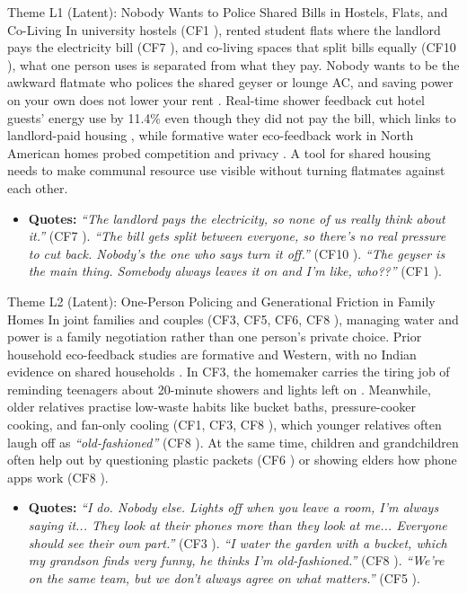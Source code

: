 \documentclass[12pt, a4paper]{article}
\begin{document}
\begin{latentcard}{Theme L1 (Latent): Nobody Wants to Police Shared Bills in Hostels, Flats, and Co-Living}
In university hostels (CF1 \cite{cf1}), rented student flats where the landlord pays the electricity bill (CF7 \cite{cf7}), and co-living spaces that split bills equally (CF10 \cite{cf10}), what one person uses is separated from what they pay. Nobody wants to be the awkward flatmate who polices the shared geyser or lounge AC, and saving power on your own does not lower your rent \cite{cf1, cf7, cf10}. Real-time shower feedback cut hotel guests' energy use by 11.4\% even though they did not pay the bill, which links to landlord-paid housing \cite{tiefenbeck2019}, while formative water eco-feedback work in North American homes probed competition and privacy \cite{froehlich2012}. A tool for shared housing needs to make communal resource use visible without turning flatmates against each other.
\begin{itemize}
    \item \textbf{Quotes:} \textit{``The landlord pays the electricity, so none of us really think about it.''} (CF7 \cite{cf7}). \textit{``The bill gets split between everyone, so there's no real pressure to cut back. Nobody's the one who says turn it off.''} (CF10 \cite{cf10}). \textit{``The geyser is the main thing. Somebody always leaves it on and I'm like, who??''} (CF1 \cite{cf1}).
\end{itemize}
\end{latentcard}

\begin{latentcard}{Theme L2 (Latent): One-Person Policing and Generational Friction in Family Homes}
In joint families and couples (CF3, CF5, CF6, CF8 \cite{cf3, cf5, cf6, cf8}), managing water and power is a family negotiation rather than one person's private choice. Prior household eco-feedback studies are formative and Western, with no Indian evidence on shared households \cite{froehlich2012, tiefenbeck2019}. In CF3, the homemaker carries the tiring job of reminding teenagers about 20-minute showers and lights left on \cite{cf3}. Meanwhile, older relatives practise low-waste habits like bucket baths, pressure-cooker cooking, and fan-only cooling (CF1, CF3, CF8 \cite{cf1, cf3, cf8}), which younger relatives often laugh off as \textit{``old-fashioned''} (CF8 \cite{cf8}). At the same time, children and grandchildren often help out by questioning plastic packets (CF6 \cite{cf6}) or showing elders how phone apps work (CF8 \cite{cf8}).
\begin{itemize}
    \item \textbf{Quotes:} \textit{``I do. Nobody else. Lights off when you leave a room, I'm always saying it... They look at their phones more than they look at me... Everyone should see their own part.''} (CF3 \cite{cf3}). \textit{``I water the garden with a bucket, which my grandson finds very funny, he thinks I'm old-fashioned.''} (CF8 \cite{cf8}). \textit{``We're on the same team, but we don't always agree on what matters.''} (CF5 \cite{cf5}).
\end{itemize}
\end{latentcard}
\end{document}

